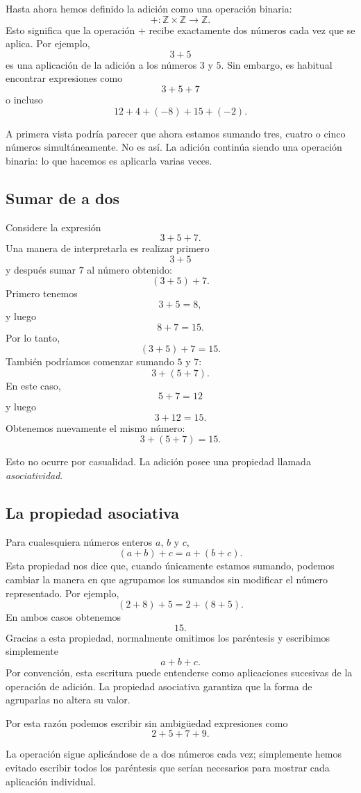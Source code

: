 Hasta ahora hemos definido la adición como una operación binaria:
\[
+\colon\mathbb{Z}\times\mathbb{Z}\to\mathbb{Z}.
\]
Esto significa que la operación \(+\) recibe exactamente dos números cada vez que se aplica. Por ejemplo,
\[
3+5
\]
es una aplicación de la adición a los números \(3\) y \(5\).
Sin embargo, es habitual encontrar expresiones como
\[
3+5+7
\]
o incluso
\[
12+4+(-8)+15+(-2).
\]

A primera vista podría parecer que ahora estamos sumando tres, cuatro o cinco números simultáneamente. No es así. La adición continúa siendo una operación binaria: lo que hacemos es aplicarla varias veces.

\subsection{Sumar de a dos}

Considere la expresión
\[
3+5+7.
\]
Una manera de interpretarla es realizar primero
\[
3+5
\]
y después sumar \(7\) al número obtenido:
\[
(3+5)+7.
\]
Primero tenemos
\[
3+5=8,
\]
y luego
\[
8+7=15.
\]
Por lo tanto,
\[
(3+5)+7=15.
\]
También podríamos comenzar sumando \(5\) y \(7\):
\[
3+(5+7).
\]
En este caso,
\[
5+7=12
\]
y luego
\[
3+12=15.
\]
Obtenemos nuevamente el mismo número:
\[
3+(5+7)=15.
\]

Esto no ocurre por casualidad. La adición posee una propiedad llamada \emph{asociatividad}.

\subsection{La propiedad asociativa}

Para cualesquiera números enteros \(a\), \(b\) y \(c\),
\[
(a+b)+c=a+(b+c).
\]
Esta propiedad nos dice que, cuando únicamente estamos sumando, podemos cambiar la manera en que agrupamos los sumandos sin modificar el número representado.
Por ejemplo,
\[
(2+8)+5=2+(8+5).
\]
En ambos casos obtenemos
\[
15.
\]
Gracias a esta propiedad, normalmente omitimos los paréntesis y escribimos simplemente
\[
a+b+c.
\]
Por convención, esta escritura puede entenderse como aplicaciones sucesivas de la operación de adición. La propiedad asociativa garantiza que la forma de agruparlas no altera su valor.

Por esta razón podemos escribir sin ambigüedad expresiones como
\[
2+5+7+9.
\]

La operación sigue aplicándose de a dos números cada vez; simplemente hemos evitado escribir todos los paréntesis que serían necesarios para mostrar cada aplicación individual.

